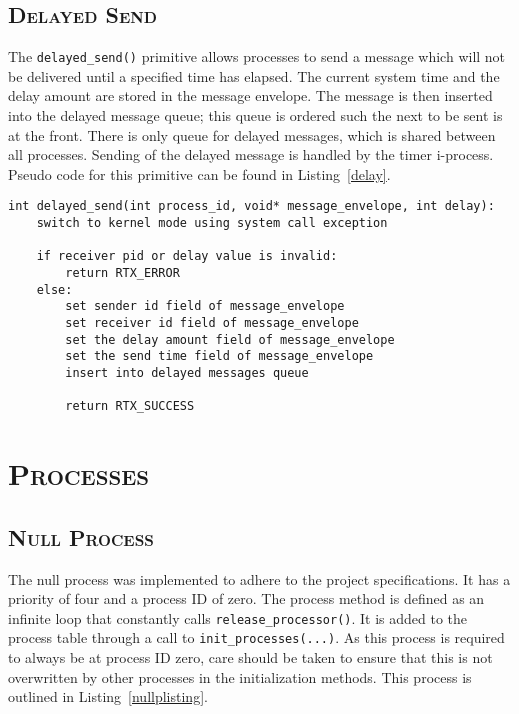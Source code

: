 \documentclass[oneside]{report}
\begin{document}
\subsection{\textsc{Delayed Send}}

The \texttt{delayed\_send()} primitive allows processes to send a
message which will not be delivered until a specified time has
elapsed. The current system time and the delay amount are stored in
the message envelope. The message is then inserted into the delayed
message queue; this queue is ordered such the next to be sent is at
the front. There is only queue for delayed messages, which is shared
between all processes. Sending of the delayed message is handled by
the timer i-process. Pseudo code for this primitive can be found in
Listing~\ref{delay}.

\begin{lstlisting}
int delayed_send(int process_id, void* message_envelope, int delay):
    switch to kernel mode using system call exception

    if receiver pid or delay value is invalid:
        return RTX_ERROR
    else:
        set sender id field of message_envelope
        set receiver id field of message_envelope
        set the delay amount field of message_envelope
        set the send time field of message_envelope
        insert into delayed messages queue

        return RTX_SUCCESS
\end{lstlisting}



\section{\textsc{Processes}}
\subsection{\textsc{Null Process}}
The null process was implemented to adhere to the project specifications. It
has a priority of four and a process ID of zero. The process method is defined 
as an infinite loop that constantly calls \texttt{release\_processor()}. It is 
added to the process table through a call to \texttt{init\_processes(...)}. As
this process is required to always be at process ID zero, care should be taken
to ensure that this is not overwritten by other processes in the initialization
methods. This process is outlined in Listing~\ref{nullplisting}.
\end{document}
